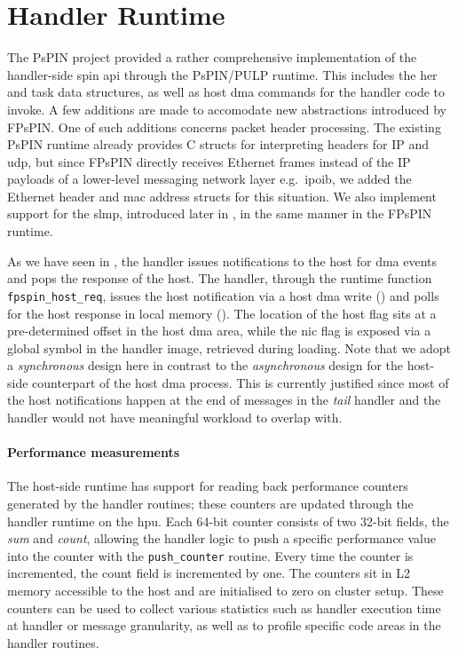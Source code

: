 \section{Handler Runtime} \label{sec:handler-runtime}

The PsPIN project provided a rather comprehensive implementation of the handler-side \ac{spin} \ac{api} through the PsPIN/PULP runtime.  This includes the \ac{her} and task data structures, as well as host \ac{dma} commands for the handler code to invoke.  A few additions are made to accomodate new abstractions introduced by FPsPIN.  One of such additions concerns packet header processing.  The existing PsPIN runtime already provides C structs for interpreting headers for IP and \ac{udp}, but since FPsPIN directly receives Ethernet frames instead of the IP payloads of a lower-level messaging network layer e.g.\ \ac{ipoib}, we added the Ethernet header and \ac{mac} address structs for this situation.  We also implement support for the \ac{slmp}, introduced later in , in the same manner in the FPsPIN runtime.

As we have seen in , the handler issues notifications to the host for \ac{dma} events and pops the response of the host.  The handler, through the runtime function \texttt{fpspin\_\-host\_\-req}, issues the host notification via a host \ac{dma} write () and polls for the host response in local memory ().  The location of the host flag sits at a pre-determined offset in the host \ac{dma} area, while the \ac{nic} flag is exposed via a global symbol in the handler image, retrieved during loading.  Note that we adopt a \emph{synchronous} design here in contrast to the \emph{asynchronous} design for the host-side counterpart of the host \ac{dma} process.  This is currently justified since most of the host notifications happen at the end of messages in the \emph{tail} handler and the handler would not have meaningful workload to overlap with.

\paragraph{Performance measurements} The host-side runtime has support for reading back performance counters generated by the handler routines; these counters are updated through the handler runtime on the \ac{hpu}.  Each 64-bit counter consists of two 32-bit fields, the \emph{sum} and \emph{count}, allowing the handler logic to push a specific performance value into the counter with the \texttt{push\_\-counter} routine.  Every time the counter is incremented, the count field is incremented by one.  The counters sit in L2 memory accessible to the host and are initialised to zero on cluster setup.  These counters can be used to collect various statistics such as handler execution time at handler or message granularity,  as well as to profile specific code areas in the handler routines.

